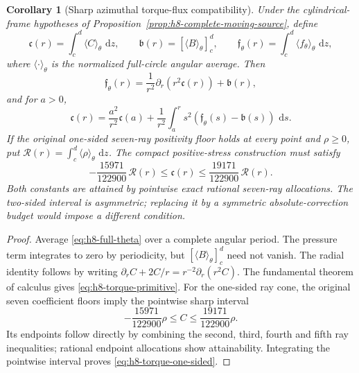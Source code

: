 \documentclass[11pt,a4paper]{article}
\theoremstyle{plain}
\newtheorem{corollary}[theorem]{Corollary}
\theoremstyle{definition}
\newcommand{\dd}{\,\mathrm{d}}
\begin{document}
\begin{corollary}[Sharp azimuthal torque-flux compatibility]
\label{cor:h8-torque-flux}
Under the cylindrical-frame hypotheses of
Proposition~\ref{prop:h8-complete-moving-source}, define
\[
 \mathfrak c(r)=\int_c^d\langle C\rangle_\theta\,\dd z,
 \qquad \mathfrak b(r)
   =[\langle B\rangle_\theta]_{c}^{d},
 \qquad \mathfrak f_\theta(r)
   =\int_c^d\langle f_\theta\rangle_\theta\,\dd z,
\]
where $\langle\cdot\rangle_\theta$ is the normalized full-circle
angular average. Then
\begin{equation}\label{eq:h8-torque-conservative}
 \mathfrak f_\theta(r)
 =\frac1{r^2}\partial_r(r^2\mathfrak c(r))+\mathfrak b(r),
\end{equation}
and for $a>0$,
\begin{equation}\label{eq:h8-torque-primitive}
 \mathfrak c(r)=\frac{a^2}{r^2}\mathfrak c(a)
 +\frac1{r^2}\int_a^r s^2
       (\mathfrak f_\theta(s)-\mathfrak b(s))\,\dd s.
\end{equation}
If the original one-sided seven-ray positivity floor holds at
every point and $\rho\ge0$, put
$\mathcal R(r)=\int_c^d\langle\rho\rangle_\theta\,\dd z$.
The compact positive-stress construction must satisfy
\begin{equation}\label{eq:h8-torque-one-sided}
 -\frac{15971}{122900}\,\mathcal R(r)
 \le\mathfrak c(r)\le
 \frac{19171}{122900}\,\mathcal R(r).
\end{equation}
Both constants are attained by pointwise exact rational seven-ray
allocations. The two-sided interval is \emph{asymmetric}; replacing
it by a symmetric absolute-correction budget would impose a
different condition.
\end{corollary}

\begin{proof}
Average \eqref{eq:h8-full-theta} over a complete angular period.
The pressure term integrates to zero by periodicity, but
$[\langle B\rangle_\theta]_c^d$ need not vanish.
The radial identity follows by writing
$\partial_rC+2C/r=r^{-2}\partial_r(r^2C)$.
The fundamental theorem of calculus gives
\eqref{eq:h8-torque-primitive}. For the one-sided ray cone,
the original seven coefficient floors imply the pointwise sharp
interval
\[
 -\frac{15971}{122900}\rho\le C\le
 \frac{19171}{122900}\rho.
\]
Its endpoints follow directly by combining the second, third,
fourth and fifth ray inequalities; rational endpoint allocations
show attainability. Integrating the pointwise interval proves
\eqref{eq:h8-torque-one-sided}.
\end{proof}
\end{document}
